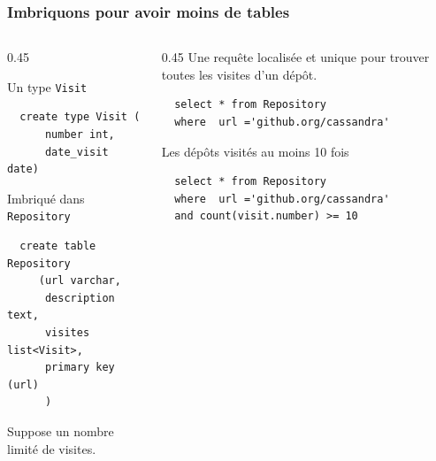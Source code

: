 \begin{frame}[fragile] \frametitle{Imbriquons pour avoir moins de tables}

\vfill
\begin{columns}
    \begin{column}{0.45\textwidth}
    
    Un type \texttt{Visit}
    
  \begin{verbatim}
  create type Visit (
      number int,
      date_visit date)
  \end{verbatim}
    
    \vfill
    Imbriqué dans \texttt{Repository}
    \vfill
  \begin{verbatim}
  create table Repository 
     (url varchar, 
      description text,
      visites list<Visit>,
      primary key (url)
      )
  \end{verbatim}
  
  \vfill
  Suppose un nombre limité de visites.
   \end{column}
 \begin{column}{0.45\textwidth}
  Une requête localisée et unique pour trouver toutes les visites d'un dépôt.

  \begin{verbatim}
  select * from Repository 
  where  url ='github.org/cassandra'
  \end{verbatim}
  
  \vfill
  Les dépôts visités au moins 10 fois
  
   \begin{verbatim}
  select * from Repository 
  where  url ='github.org/cassandra'
  and count(visit.number) >= 10
  \end{verbatim}
  
\end{column}
\end{columns}
	
\end{frame}


